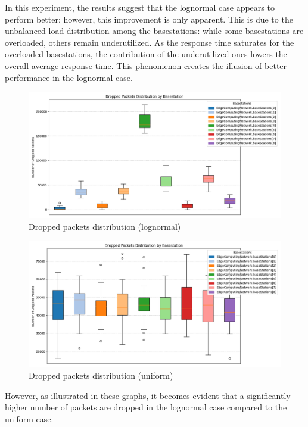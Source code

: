 \documentclass{report}
\begin{document}
In this experiment, the results suggest that the lognormal case appears to perform better; however, this improvement is only apparent. This is due to the unbalanced load distribution among the basestations: while some basestations are overloaded, others remain underutilized. As the response time saturates for the overloaded basestations, the contribution of the underutilized ones lowers the overall average response time. This phenomenon creates the illusion of better performance in the lognormal case.

\begin{figure}[H]
    \centering
    \includegraphics[width=\textwidth]{img/plots/log_1e4_A/dropped.png}
    \caption{Dropped packets distribution (lognormal)}
\end{figure}

\begin{figure}[H]
    \centering
    \includegraphics[width=\textwidth]{img/plots/uni_1e4_A/dropped.png}
    \caption{Dropped packets distribution (uniform)}
\end{figure}

\begin{flushleft}
However, as illustrated in these graphs, it becomes evident that a significantly higher number of packets are dropped in the lognormal case compared to the uniform case.
\end{flushleft}
\end{document}
